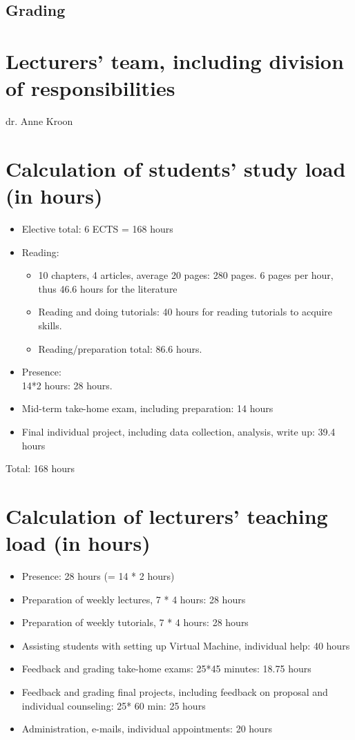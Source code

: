 \documentclass[a4paper,12pt]{report}
\begin{document}
\endgroup

\section*{Grading}


\chapter{Lecturers' team, including division of responsibilities}
dr. Anne Kroon


\chapter{Calculation of students' study load (in hours)}
\begin{itemize}

\item Elective total: 6 ECTS = 168 hours
\item Reading: 
\begin{itemize}
\item 10 chapters, 4 articles, average 20 pages: 280 pages. 6 pages per hour, thus 46.6 hours for the literature
\item Reading and doing tutorials: 40 hours for reading tutorials to acquire skills.
\item Reading/preparation total: 86.6 hours.
\end{itemize}
\item Presence: \\14*2 hours: 28 hours.
\item Mid-term take-home exam, including preparation: 14 hours
\item Final individual project, including data collection, analysis, write up: 39.4 hours
\end{itemize}

Total: 168 hours


\chapter{Calculation of lecturers' teaching load (in hours)}

\begin{itemize}
\item Presence: 28 hours (= 14 * 2 hours)
\item Preparation of weekly lectures, 7 * 4 hours: 28 hours
\item Preparation of weekly tutorials, 7 * 4 hours: 28 hours
\item Assisting students with setting up Virtual Machine, individual help: 40 hours
\item Feedback and grading take-home exams: 25*45 minutes: 18.75 hours
\item Feedback and grading final projects, including feedback on proposal and individual counseling: 25* 60 min: 25 hours 
\item Administration, e-mails, individual appointments: 20 hours
\end{itemize}
\end{document}
